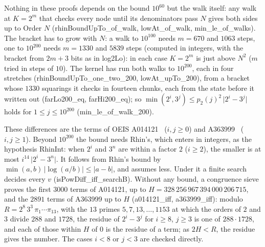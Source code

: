 \documentclass[10pt,a4paper,titlepage]{article}
\newcommand{\lean}[1]{\textsf{#1}}
\begin{document}
Nothing in these proofs depends on the bound $10^{60}$ but the walk itself: any walk at
$K = 2^m$ that checks every node until its denominators pass $N$ gives both sides up to
Order $N$ (\lean{rhinBoundUpTo\_of\_walk}, \lean{lowAt\_of\_walk},
\lean{min\_le\_of\_walks}). The bracket has to grow with $N$: a walk to $10^{100}$ needs
$m = 670$ and $1063$ steps, one to $10^{200}$ needs $m = 1330$ and $5839$ steps
(computed in integers, with the bracket from $2m + 3$ bits as in \lean{log2Lo}): in each
case $K = 2^m$ is just above $N^2$ ($m$ tried in steps of $10$). The kernel has run both
walks to $10^{200}$, each in four stretches (\lean{rhinBoundUpTo\_one\_two\_200},
\lean{lowAt\_upTo\_200}), from a bracket whose $1330$ squarings it checks in fourteen
chunks, each from the state before it written out (\lean{farLo200\_eq},
\lean{farHi200\_eq}); so
$\min(2^i, 3^j) \le p_2(j)^2\,\lvert 2^i - 3^j \rvert$ holds for $1 \le j \le 10^{200}$
(\lean{min\_le\_of\_walk\_200}).

These differences are the terms of OEIS A014121~\cite{OEIS_A014121} ($i, j \ge 0$) and
A363999~\cite{OEIS_A363999} ($i, j \ge 1$). Beyond $10^{200}$ the bound needs Rhin's, which
enters in integers, as the hypothesis \lean{RhinInt}: when $2^i$ and $3^n$ are within a
factor $2$ ($i \ge 2$), the smaller is at most $i^{14}\,\lvert 2^i - 3^n \rvert$. It follows
from Rhin's bound by $\min(a, b)\,\lvert \log(a/b) \rvert \le \lvert a - b \rvert$, and
assumes less. Under it a finite search decides every $v$ (\lean{isPowDiff\_iff\_searchB}).
Without any bound, a congruence sieve proves the first $3000$ terms of A014121, up to
$H = 328\,256\,967\,394\,000\,206\,715$, and the $2891$ terms of A363999 up to $H$
(\lean{a014121\_iff}, \lean{a363999\_iff}): modulo $R = 2^8\,3^3\,\pi_1 \cdots \pi_{13}$, with
the $13$ primes $5, 7, 13, \ldots, 1153$ at which the orders of $2$ and $3$ divide $288$ and
$1728$, the residue of $2^i - 3^j$ for $i \ge 8$, $j \ge 3$ is one of $288 \cdot 1728$, and
each of those within $H$ of $0$ is the residue of a term; as $2H < R$, the residue gives
the number. The cases $i < 8$ or $j < 3$ are checked directly.

\nopagebreak
\end{document}
